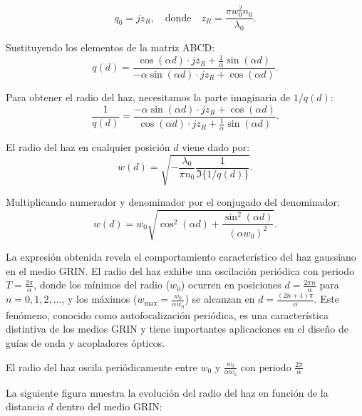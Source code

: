 \documentclass[11pt]{article}
\begin{document}
\[
q_0 = j z_R,\quad \text{donde}\quad z_R = \frac{\pi w_0^2 n_0}{\lambda_0}.
\]

Sustituyendo los elementos de la matriz ABCD:
\[
q(d) = \frac{\cos(\alpha d)\cdot j z_R + \frac{1}{\alpha}\sin(\alpha d)}{-\alpha\sin(\alpha d)\cdot j z_R + \cos(\alpha d)}.
\]

Para obtener el radio del haz, necesitamos la parte imaginaria de \(1/q(d)\):
\[
\frac{1}{q(d)} = \frac{-\alpha\sin(\alpha d)\cdot j z_R + \cos(\alpha d)}{\cos(\alpha d)\cdot j z_R + \frac{1}{\alpha}\sin(\alpha d)}.
\]

El radio del haz en cualquier posición \(d\) viene dado por:
\[
w(d) = \sqrt{-\frac{\lambda_0}{\pi n_0}\frac{1}{\Im\{1/q(d)\}}}.
\]

Multiplicando numerador y denominador por el conjugado del denominador:
\[
w(d) = w_0\sqrt{\cos^2(\alpha d) + \frac{\sin^2(\alpha d)}{(\alpha w_0)^2}}.
\]

La expresión obtenida revela el comportamiento característico del haz gaussiano en el medio GRIN. El radio del haz exhibe una oscilación periódica con periodo \(T = \frac{2\pi}{\alpha}\), donde los mínimos del radio (\(w_0\)) ocurren en posiciones \(d = \frac{2\pi n}{\alpha}\) para \(n = 0,1,2,\ldots\), y los máximos (\(w_{\max} = \frac{w_0}{\alpha w_0}\)) se alcanzan en \(d = \frac{(2n+1)\pi}{\alpha}\). Este fenómeno, conocido como autofocalización periódica, es una característica distintiva de los medios GRIN y tiene importantes aplicaciones en el diseño de guías de onda y acopladores ópticos.

El radio del haz oscila periódicamente entre \(w_0\text{ y }\frac{w_0}{\alpha w_0}\text{ con periodo }\frac{2\pi}{\alpha}\)

La siguiente figura muestra la evolución del radio del haz en función de la distancia \(d\) dentro del medio GRIN:

\begin{center}
\end{center}
\end{document}
